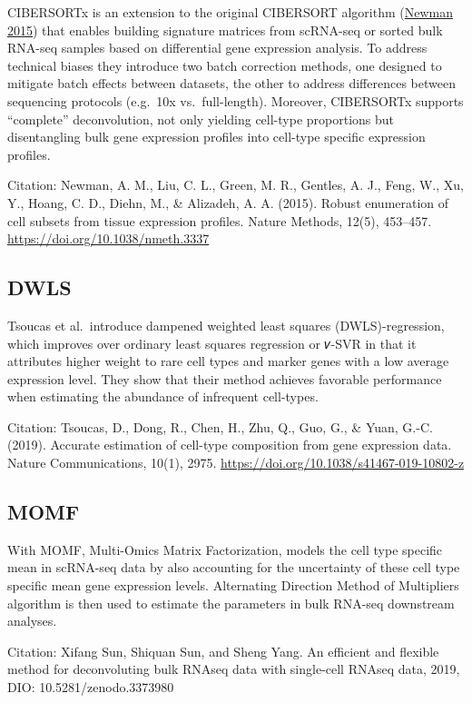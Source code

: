 \documentclass[
]{article}
\begin{document}
CIBERSORTx is an extension to the original CIBERSORT algorithm
(\protect\hyperlink{ref-Newman2015}{Newman 2015}) that enables building
signature matrices from scRNA-seq or sorted bulk RNA-seq samples based
on differential gene expression analysis. To address technical biases
they introduce two batch correction methods, one designed to mitigate
batch effects between datasets, the other to address differences between
sequencing protocols (e.g.~10x vs.~full-length). Moreover, CIBERSORTx
supports ``complete'' deconvolution, not only yielding cell-type
proportions but disentangling bulk gene expression profiles into
cell-type specific expression profiles.

Citation: Newman, A. M., Liu, C. L., Green, M. R., Gentles, A. J., Feng,
W., Xu, Y., Hoang, C. D., Diehn, M., \& Alizadeh, A. A. (2015). Robust
enumeration of cell subsets from tissue expression profiles. Nature
Methods, 12(5), 453--457. \url{https://doi.org/10.1038/nmeth.3337}

\hypertarget{dwls}{%
\subsection{DWLS}\label{dwls}}

Tsoucas et al.~introduce dampened weighted least squares
(DWLS)-regression, which improves over ordinary least squares regression
or 𝜈-SVR in that it attributes higher weight to rare cell types and
marker genes with a low average expression level. They show that their
method achieves favorable performance when estimating the abundance of
infrequent cell-types.

Citation: Tsoucas, D., Dong, R., Chen, H., Zhu, Q., Guo, G., \& Yuan,
G.-C. (2019). Accurate estimation of cell-type composition from gene
expression data. Nature Communications, 10(1), 2975.
\url{https://doi.org/10.1038/s41467-019-10802-z}

\hypertarget{momf}{%
\subsection{MOMF}\label{momf}}

With MOMF, Multi-Omics Matrix Factorization, models the cell type
specific mean in scRNA-seq data by also accounting for the uncertainty
of these cell type specific mean gene expression levels. Alternating
Direction Method of Multipliers algorithm is then used to estimate the
parameters in bulk RNA-seq downstream analyses.

Citation: Xifang Sun, Shiquan Sun, and Sheng Yang. An efficient and
flexible method for deconvoluting bulk RNAseq data with single-cell
RNAseq data, 2019, DIO: 10.5281/zenodo.3373980
\end{document}
